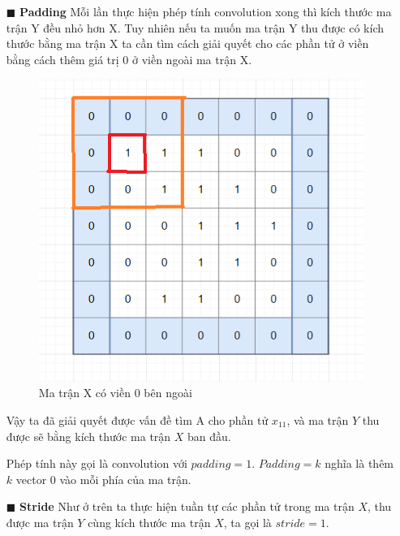 \begin{itemize}
\item[$\blacksquare$] \textbf{Padding}
Mỗi lần thực hiện phép tính convolution xong thì kích thước ma trận Y đều nhỏ hơn X. Tuy nhiên nếu ta muốn ma trận Y thu được có kích thước bằng ma trận X ta cần tìm cách giải quyết cho các phần tử ở viền bằng cách thêm giá trị 0 ở viền ngoài ma trận X.

\FloatBarrier
\begin{figure}[htp]
\begin{center}
\includegraphics[scale=0.65]{chap2/c2_figs/10.png}
\end{center}
\caption{Ma trận X có viền 0 bên ngoài}
\label{fig:padding}
\end{figure}
\FloatBarrier

Vậy ta đã giải quyết được vấn đề tìm A cho phần tử $x_{11}$, và ma trận $Y$ thu được sẽ bằng kích thước ma trận $X$ ban đầu.

Phép tính này gọi là convolution với $padding=1$. $Padding=k$ nghĩa là thêm $k$ vector $0$ vào mỗi phía của ma trận.

\item[$\blacksquare$] \textbf{Stride}
Như ở trên ta thực hiện tuần tự các phần tử trong ma trận $X$, thu được ma trận $Y$ cùng kích thước ma trận $X$, ta gọi là $stride=1$.


\end{itemize}
